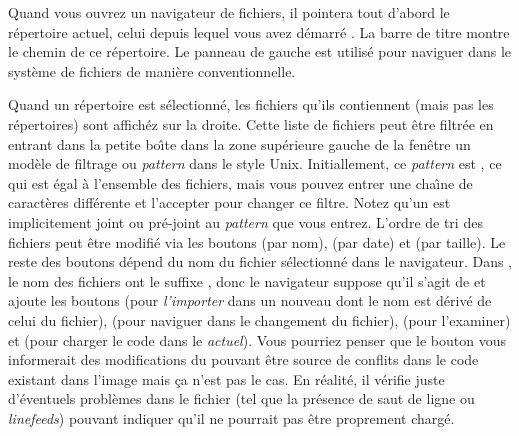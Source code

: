 \documentclass[a4paper,10pt,twoside]{book}
\begin{document}
Quand vous ouvrez un navigateur de fichiers, il pointera tout d'abord le r\'epertoire
actuel, \ie celui depuis lequel vous avez d\'emarr\'e \sq. La barre de titre
montre le chemin de ce r\'epertoire.
Le panneau de gauche est utilis\'e pour naviguer dans le syst\`eme de fichiers de mani\`ere
conventionnelle.

Quand un r\'epertoire est s\'electionn\'e, les fichiers qu'ils contiennent (mais pas les r\'epertoires) sont affich\'ez sur la droite.
Cette liste de fichiers peut \^etre filtr\'ee en entrant dans la petite bo\^{\i}te
dans la zone sup\'erieure gauche de la fen\^etre un mod\`ele de filtrage ou 
\emph{pattern} dans le style Unix.
Initiallement, ce \emph{pattern} est \ct{*}, ce qui est \'egal \`a l'ensemble des fichiers, mais vous pouvez entrer une cha\^{\i}ne de caract\`eres diff\'erente et l'accepter pour changer ce filtre. 
Notez qu'un \ct{*} est implicitement joint ou pr\'e-joint au \emph{pattern}
que vous entrez.
L'ordre de tri des fichiers peut \^etre modifi\'e via les boutons  (par nom),  (par date) et  (par taille).
Le reste des boutons d\'epend du nom du fichier s\'electionn\'e dans le navigateur.
Dans , le nom des fichiers ont le suffixe , donc le navigateur
suppose qu'il s'agit de \changeset et ajoute les boutons  (pour
\textit{l'importer} dans un nouveau \changeset dont le nom est d\'eriv\'e
de celui du fichier),  (pour naviguer dans le changement du fichier),
 (pour l'examiner) et  (pour charger
le code dans le \changeset \emph{actuel}).
Vous pourriez penser que le bouton  vous informerait 
des modifications du \changeset pouvant \^etre source de conflits dans le code existant
dans l'image mais \c{c}a n'est pas le cas.
En r\'ealit\'e, il v\'erifie juste d'\'eventuels probl\`emes dans le fichier (tel que
la pr\'esence de saut de ligne ou \textit{linefeeds})
pouvant indiquer qu'il ne pourrait pas \^etre proprement charg\'e.
\end{document}
